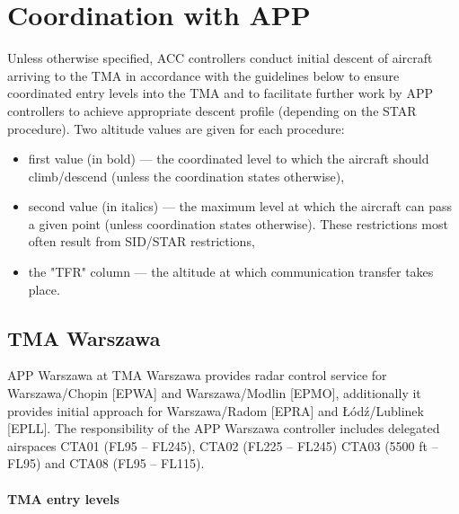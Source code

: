 
\chapter{Coordination with APP}
\label{chap:acc:coordination}

Unless otherwise specified, ACC controllers conduct initial descent of aircraft
arriving to the TMA in accordance with the guidelines below to ensure
coordinated entry levels into the TMA and to facilitate further work by APP
controllers to achieve appropriate descent profile (depending on the STAR
procedure). Two altitude values are given for each procedure:
\begin{itemize}
\item first value (in bold) --- the coordinated level to which the aircraft
  should climb/descend (unless the coordination states otherwise),
\item second value (in italics) --- the maximum level at which the aircraft can
  pass a given point (unless coordination states otherwise). These restrictions
  most often result from SID/STAR restrictions,
\item the "TFR" column --- the altitude at which communication transfer takes
  place.
\end{itemize}

\section{TMA Warszawa}
\label{sec:acc:coordination:Warszawa}

APP Warszawa at TMA Warszawa provides radar control service for Warszawa/Chopin
[EPWA] and Warszawa/Modlin [EPMO], additionally it provides initial approach for
Warszawa/Radom [EPRA] and Łódź/Lublinek [EPLL]. The responsibility of the APP
Warszawa controller includes delegated airspaces CTA01 (FL95 -- FL245), CTA02
(FL225 -- FL245) CTA03 (5500 ft -- FL95) and CTA08 (FL95 -- FL115).

\subsubsection{TMA entry levels}




